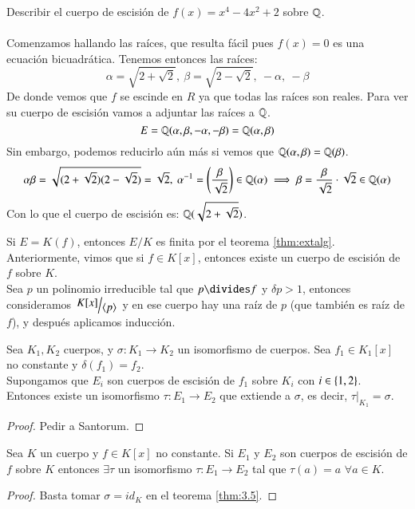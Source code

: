 \begin{ex}
    Describir el cuerpo de escisión de $f(x) = x^4 - 4x^2 + 2$ sobre $\mathbb{Q}$.\\\\
    Comenzamos hallando las raíces, que resulta fácil pues $f(x) = 0$ es una ecuación bicuadrática. Tenemos entonces las raíces:
    $$
        \alpha = \sqrt{2 + \sqrt 2},\ \beta = \sqrt{2 - \sqrt{2}},\ -\alpha,\ -\beta
    $$
    De donde vemos que $f$ se escinde en $R$ ya que todas las raíces son reales. Para ver su cuerpo de escisión vamos a adjuntar las raíces a $\mathbb{Q}$.
    $$
        E = \mathbb{Q}(\alpha,  \beta, -\alpha, -\beta) = \mathbb{Q}(\alpha, \beta)
    $$
    Sin embargo, podemos reducirlo aún más si vemos que $\mathbb{Q}(\alpha, \beta) = \mathbb{Q}(\beta)$.
    $$
        \alpha\beta = \sqrt{(2 + \sqrt 2)(2 - \sqrt 2)} = \sqrt 2,\ \alpha^{-1} = \left(\frac{\beta}{\sqrt 2}\right) \in \mathbb{Q}(\alpha) \implies \beta = \frac{\beta}{\sqrt 2} \cdot \sqrt 2 \in \mathbb{Q}(\alpha)
    $$
    Con lo que el cuerpo de escisión es: $\mathbb{Q}(\sqrt{2 + \sqrt 2})$.
\end{ex}

\begin{obs}
    Si $E = K(f)$, entonces $E/K$ es finita por el teorema \ref{thm:extalg}. Anteriormente, vimos que si $f \in K[x]$, entonces existe un cuerpo de escisión de $f$ sobre $K$.\\
    Sea $p$ un polinomio irreducible tal que $p \divides f$ y $\delta p > 1$, entonces consideramos $\quo{K[x]}{\gen{p}}$ y en ese cuerpo hay una raíz de $p$ (que también es raíz de $f$), y después aplicamos inducción.
\end{obs}

\begin{thm}\label{thm:3.5}
    Sea $K_1, K_2$ cuerpos, y $\sigma: K_1 \to K_2$ un isomorfismo de cuerpos. Sea $f_1 \in K_1[x]$ no constante y $\delta(f_1) = f_2$.\\ Supongamos que $E_i$ son cuerpos de escisión de $f_1$ sobre $K_i$ con $i \in \left\{1, 2\right\}$. Entonces existe un isomorfismo $\tau: E_1 \to E_2$ que extiende a $\sigma$, es decir, $\left. \tau \right|_{K_1} = \sigma$.
\end{thm}

\begin{proof}
    Pedir a Santorum.
\end{proof}

\begin{cor}
    Sea $K$ un cuerpo y $f \in K[x]$ no constante. Si $E_1$ y $E_2$ son cuerpos de escisión de $f$ sobre $K$ entonces $\exists \tau$ un isomorfismo $\tau: E_1 \to E_2$ tal que $\tau(a) = a$ $\forall a \in K$.
\end{cor}
\begin{proof}
    Basta tomar $\sigma = id_K$ en el teorema \ref{thm:3.5}.
\end{proof}

